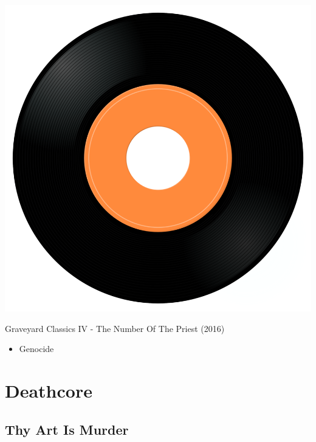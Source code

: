 \begin{minipage}[t]{0.25\textwidth}\vspace{0pt}
\captionsetup{type=figure}
\includegraphics[width=\textwidth]{Images/cover.png}
\caption*{Graveyard Classics IV - The Number Of The Priest (2016)}
\end{minipage}
\begin{minipage}[t]{0.25\textwidth}\vspace{0pt}
\begin{itemize}[nosep,leftmargin=1em,labelwidth=*,align=left]
	\setlength{\itemsep}{0pt}
	\item Genocide
\end{itemize}
\end{minipage}

\cleardoublepage
\section{Deathcore}

\subsection{Thy Art Is Murder}

